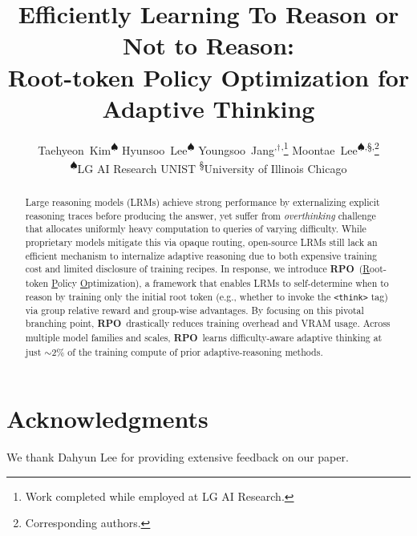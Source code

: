 \documentclass[11pt]{article}
\title{Efficiently Learning To Reason or Not to Reason:\\Root-token Policy Optimization for Adaptive Thinking}
\author{
  Taehyeon~Kim\textsuperscript{$\spadesuit$}\quad
  Hyunsoo~Lee\textsuperscript{$\spadesuit$}\quad
  Youngsoo~Jang\textsuperscript{\ddag,}$^{\dag}$\textsuperscript{,}\thanks{Work completed while employed at LG AI Research.}\quad
  Moontae~Lee\textsuperscript{$\spadesuit$,\S,}\thanks{Corresponding authors.}\\[6pt]
  \textsuperscript{$\spadesuit$}LG AI Research\quad
  \textsuperscript{\ddag}UNIST\quad
  \textsuperscript{\S}University of Illinois Chicago
}
\newcommand{\Ours}{\textsc{\textbf{RPO}}}
\begin{document}
\maketitle
\begin{abstract}
Large reasoning models (LRMs) achieve strong performance by externalizing explicit reasoning traces before producing the answer,
yet suffer from \textit{overthinking} challenge that allocates uniformly heavy computation to queries of varying difficulty. 
While proprietary models mitigate this via opaque routing, open-source LRMs still lack an efficient mechanism to internalize adaptive reasoning due to both expensive training cost and limited disclosure of training recipes. 
In response, we introduce \Ours~(\underline{R}oot-token \underline{P}olicy \underline{O}ptimization), a framework that enables LRMs to self-determine when to reason by training only the initial root token (e.g., whether to invoke the \texttt{<think>} tag) via group relative reward and group-wise advantages. 
By focusing on this pivotal branching point, \Ours~drastically reduces training overhead and VRAM usage. Across multiple model families and scales, \Ours~learns difficulty-aware adaptive thinking at just $\sim$2\% of the training compute of prior adaptive-reasoning methods.
\end{abstract}








\section*{Acknowledgments}

We thank Dahyun Lee for providing extensive feedback on our paper.




\end{document}
